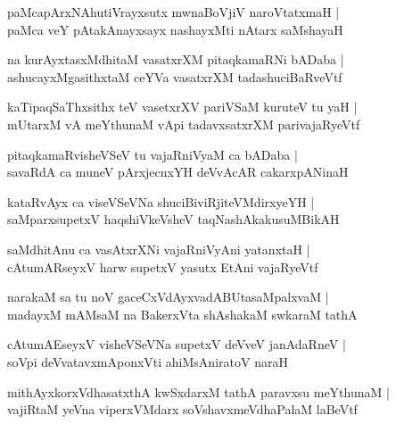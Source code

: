 \documentclass[twoside,12pt,openright]{book}
\newcounter{shloka}[chapter]
\begin{document}
\begin{shloka}%
paMcapArxNAhutiVrayxsutx mwnaBoVjiV naroVtatxmaH |\\
paMca veY pAtakAnayxsayx nashayxMti nAtarx saMshayaH 
\end{shloka}

\begin{shloka}%
na kurAyxtasxMdhitaM vasatxrXM pitaqkamaRNi bADaba |\\
ashucayxMgasithxtaM ceYVa vasatxrXM tadashuciBaRveVtf
\end{shloka}

\begin{shloka}%
kaTipaqSaThxsithx teV vasetxrXV pariVSaM kuruteV tu yaH |\\
mUtarxM vA meYthunaM vApi tadavxsatxrXM parivajaRyeVtf
\end{shloka}

\begin{shloka}%
pitaqkamaRvisheVSeV tu vajaRniVyaM ca bADaba |\\
savaRdA ca muneV pArxjecnxYH deVvAcAR cakarxpANinaH
\end{shloka}

\begin{shloka}%
kataRvAyx ca viseVSeVNa shuciBiviRjiteVMdirxyeYH |\\
saMparxsupetxV haqshiVkeVsheV taqNashAkakusuMBikAH
\end{shloka}

\begin{shloka}%
saMdhitAnu ca vasAtxrXNi vajaRniVyAni yatanxtaH |\\
cAtumARseyxV harw supetxV yasutx EtAni vajaRyeVtf 
\end{shloka}

\begin{shloka}%
narakaM sa tu noV gaceCxVdAyxvadABUtasaMpalxvaM |\\
madayxM mAMsaM na BakerxVta shAshakaM swkaraM tathA
\end{shloka}

\begin{shloka}%
cAtumAEseyxV visheVSeVNa supetxV deVveV janAdaRneV |\\
soVpi deVvatavxmAponxVti ahiMsAniratoV naraH 
\end{shloka}

\begin{shloka}%
mithAyxkorxVdhasatxthA kwSxdarxM tathA paravxsu meYthunaM |\\
vajiRtaM yeVna viperxVMdarx soVshavxmeVdhaPalaM laBeVtf
\end{shloka}
\end{document}
